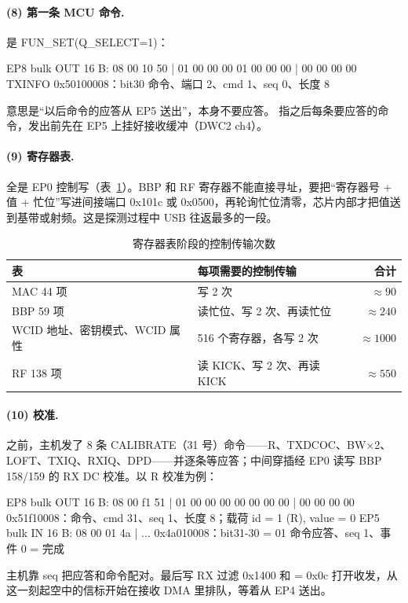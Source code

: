 \paragraph{(8) 第一条 MCU 命令.}  是 FUN\_SET(Q\_SELECT=1)：
\begin{txtcode}
EP8  bulk OUT 16 B:  08 00 10 50 | 01 00 00 00 01 00 00 00 | 00 00 00 00
                     TXINFO 0x50100008：bit30 命令、端口 2、cmd 1、seq 0、长度 8
\end{txtcode}
意思是“以后命令的应答从 EP5 送出”，本身不要应答。 指之后每条要应答的命令，发出前先在 EP5 上挂好接收缓冲（DWC2 ch4）。

\paragraph{(9) 寄存器表.}  全是 EP0 控制写（表~\ref{tab:mt7601u-ctrlcount}）。BBP 和 RF 寄存器不能直接寻址，要把“寄存器号 + 值 + 忙位”写进间接端口 0x101c 或 0x0500，再轮询忙位清零，芯片内部才把值送到基带或射频。这是探测过程中 USB 往返最多的一段。

\begin{table}[htbp]
  \centering
  \caption{寄存器表阶段的控制传输次数}
  \label{tab:mt7601u-ctrlcount}
  \small
  \begin{tabularx}{\linewidth}{@{}lXr@{}}
    \toprule
    表 & 每项需要的控制传输 & 合计 \\
    \midrule
    MAC 44 项 & 写 2 次 & $\approx 90$ \\
    BBP 59 项 & 读忙位、写 2 次、再读忙位 & $\approx 240$ \\
    WCID 地址、密钥模式、WCID 属性 & 516 个寄存器，各写 2 次 & $\approx 1000$ \\
    RF 138 项 & 读 KICK、写 2 次、再读 KICK & $\approx 550$ \\
    \bottomrule
  \end{tabularx}
\end{table}

\paragraph{(10) 校准.}  之前，主机发了 8 条 CALIBRATE（31 号）命令——R、TXDCOC、BW$\times$2、LOFT、TXIQ、RXIQ、DPD——并逐条等应答；中间穿插经 EP0 读写 BBP 158/159 的 RX DC 校准。以 R 校准为例：
\begin{txtcode}
EP8  bulk OUT 16 B:  08 00 f1 51 | 01 00 00 00 00 00 00 00 | 00 00 00 00
                     0x51f10008：命令、cmd 31、seq 1、长度 8；载荷 {id = 1 (R), value = 0}
EP5  bulk IN  16 B:  08 00 01 4a | ...
                     0x4a010008：bit31-30 = 01 命令应答、seq 1、事件 0 = 完成
\end{txtcode}
主机靠 seq 把应答和命令配对。最后写 RX 过滤 0x1400 和  = 0x0c 打开收发，从这一刻起空中的信标开始在接收 DMA 里排队，等着从 EP4 送出。

